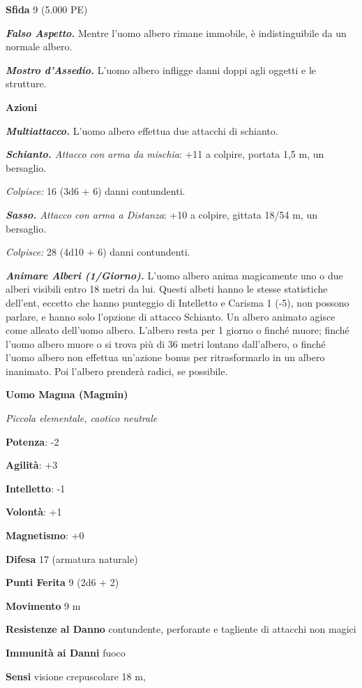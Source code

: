 \begin{multicols}{2}
\textbf{Sfida} 9 (5.000 PE)

\emph{\textbf{Falso Aspetto.}} Mentre l'uomo albero rimane immobile, è
indistinguibile da un normale albero.

\emph{\textbf{Mostro d'Assedio.}} L'uomo albero infligge danni doppi
agli oggetti e le strutture.

\textbf{Azioni}

\emph{\textbf{Multiattacco.}} L'uomo albero effettua due attacchi di
schianto.

\emph{\textbf{Schianto.} Attacco con arma da mischia}: +11 a colpire,
portata 1,5 m, un bersaglio.

\emph{Colpisce:} 16 (3d6 + 6) danni contundenti.

\emph{\textbf{Sasso.} Attacco con arma a Distanza}: +10 a colpire,
gittata 18/54 m, un bersaglio.

\emph{Colpisce:} 28 (4d10 + 6) danni contundenti.

\emph{\textbf{Animare Alberi (1/Giorno).}} L'uomo albero anima
magicamente uno o due alberi visibili entro 18 metri da lui. Questi
albeti hanno le stesse statistiche dell'ent, eccetto che hanno punteggio
di Intelletto e Carisma 1 (-5), non possono parlare, e hanno solo
l'opzione di attacco Schianto. Un albero animato agisce come alleato
dell'uomo albero. L'albero resta per 1 giorno o finché muore; finché
l'uomo albero muore o si trova più di 36 metri lontano dall'albero, o
finché l'uomo albero non effettua un'azione bonus per ritrasformarlo in
un albero inanimato. Poi l'albero prenderà radici, se possibile.



\textbf{Uomo Magma (Magmin)}

\emph{Piccola elementale, caotico neutrale}

\textbf{Potenza}: -2

\textbf{Agilità}: +3

\textbf{Intelletto}: -1

\textbf{Volontà}: +1

\textbf{Magnetismo}: +0

\textbf{Difesa} 17 (armatura naturale)

\textbf{Punti Ferita} 9 (2d6 + 2)

\textbf{Movimento} 9 m

\textbf{Resistenze al Danno} contundente, perforante e tagliente di
attacchi non magici

\textbf{Immunità ai Danni} fuoco

\textbf{Sensi} visione crepuscolare 18 m, 


\end{multicols}
